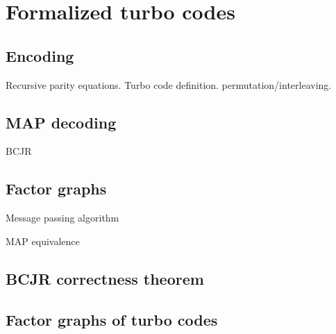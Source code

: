 \chapter{Formalized turbo codes}

\section{Encoding}

Recursive parity equations. Turbo code definition. permutation/interleaving.

\section{MAP decoding}

BCJR

\section{Factor graphs}

Message passing algorithm

MAP equivalence

\section{BCJR correctness theorem}

\section{Factor graphs of turbo codes}
